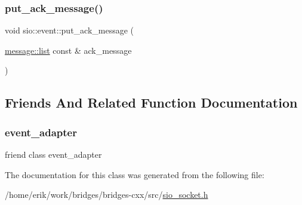 \mbox{\label{classsio_1_1event_a9f7d62c97996e85bdff7de53932a595a}} 
\subsubsection{\texorpdfstring{put\+\_\+ack\+\_\+message()}{put\_ack\_message()}}
{\footnotesize\ttfamily void sio\+::event\+::put\+\_\+ack\+\_\+message (\begin{DoxyParamCaption}\item[{\hyperlink{classsio_1_1message_1_1list}{message\+::list} const \&}]{ack\+\_\+message }\end{DoxyParamCaption})}



\subsection{Friends And Related Function Documentation}
\mbox{\label{classsio_1_1event_ac57524faa4b3dfacdf1bceec92894a03}} 
\subsubsection{\texorpdfstring{event\+\_\+adapter}{event\_adapter}}
{\footnotesize\ttfamily friend class event\+\_\+adapter\hspace{0.3cm}{\ttfamily [friend]}}



The documentation for this class was generated from the following file\+:\begin{DoxyCompactItemize}
\item 
/home/erik/work/bridges/bridges-\/cxx/src/\hyperlink{sio__socket_8h}{sio\+\_\+socket.\+h}\end{DoxyCompactItemize}
